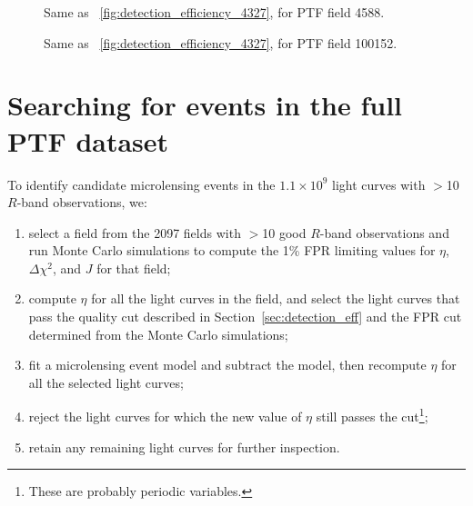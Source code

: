 \documentclass{emulateapj}
\begin{document}

\begin{figure}
\centering
	
\caption{Same as \figurename~\ref{fig:detection_efficiency_4327}, for PTF field 4588.}\label{fig:detection_efficiency_4588}
\end{figure}

\begin{figure}
\centering
	
\caption{Same as \figurename~\ref{fig:detection_efficiency_4327}, for PTF field 100152.}\label{fig:detection_efficiency_100152}
\end{figure}

\section{Searching for events in the full PTF dataset}\label{sec:search}
To identify candidate microlensing events in the $1.1\times10^9$ light curves with $>$10 $R$-band observations, we:
\begin{enumerate}
	\item select a field from the 2097 fields with $>$10 good $R$-band observations and run Monte Carlo simulations to compute the 1\% FPR limiting values for $\eta$, $\Delta \chi^2$, and $J$ for that field;
	\item compute $\eta$ for all the light curves in the field, and select the light curves that pass the quality cut described in Section~\ref{sec:detection_eff} and the FPR cut determined from the Monte Carlo simulations;
	\item fit a microlensing event model and subtract the model, then recompute $\eta$ for all the selected light curves;
	\item reject the light curves for which the new value of $\eta$ still passes the cut\footnote{These are probably periodic variables.};
	\item retain any remaining light curves for further inspection.
\end{enumerate}
\end{document}
